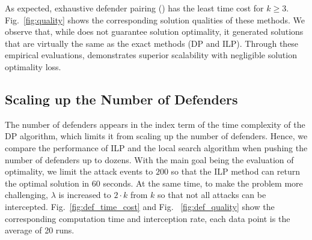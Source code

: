 As expected, exhaustive defender pairing (\ours) has the least time cost for $k \geq 3$.
Fig.~\ref{fig:quality} shows the corresponding solution qualities of these methods. 
We observe that, while \ours does not guarantee solution optimality, it generated solutions that are virtually the same as the exact methods (DP and ILP). 
%
Through these empirical evaluations, \ours demonstrates superior scalability with negligible solution optimality loss. 



\subsection{Scaling up the Number of Defenders}
The number of defenders appears in the index term of the time complexity of the DP algorithm, which limits it from scaling up the number of defenders. Hence, we compare the performance of ILP and the local search algorithm when pushing the number of defenders up to dozens. With the main goal being the evaluation of optimality, we limit the attack events to $200$ so that the ILP method can return the optimal solution in $60$ seconds. At the same time, to make the problem more challenging, $\lambda$ is increased to $2\cdot k$ from $k$ so that not all attacks can be intercepted. Fig.~\ref{fig:def_time_cost} and Fig. ~\ref{fig:def_quality} show the corresponding computation time and interception rate, each data point is the average of 20 runs.

